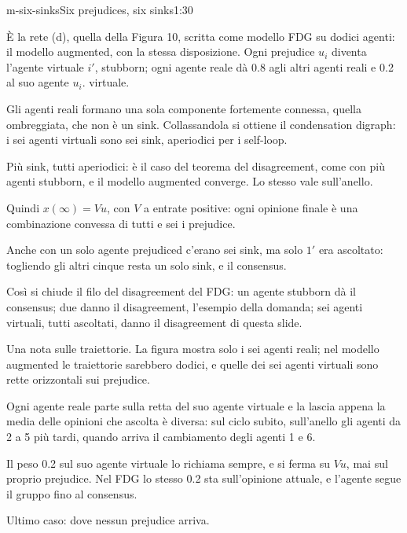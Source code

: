 \begin{slidetre}{m-six-sinks}{Six prejudices, six sinks}{1:30 {\color{red}}}
  \begin{discorso}
    \item {\color{red}   } {\color{blue}È la rete (d), quella} della {\color{red} } {\color{blue}Figura 10, scritta} come modello FDG su dodici {\color{red}} {\color{blue}agenti:} il modello {\color{red}} {\color{blue}augmented, con la stessa disposizione.} Ogni {\color{blue}prejudice $u_i$ diventa l'agente virtuale $i'$, stubborn; ogni} agente reale dà {\color{red} } 0.8 agli altri agenti reali e 0.2 al suo agente {\color{red}     } {\color{red}$u_i$.} {\color{blue}virtuale.}
    \item Gli agenti reali formano una sola componente fortemente connessa, quella ombreggiata, che non è un sink. Collassandola si ottiene il condensation digraph: i sei agenti virtuali sono sei sink, aperiodici per i self-loop.
    \item Più sink, tutti aperiodici: {\color{red}} {\color{blue}è} il {\color{blue}caso del} teorema del {\color{red}    } disagreement, come con più agenti {\color{red}} {\color{blue}stubborn, e il modello augmented converge.} Lo stesso vale sull'anello.
    \item {\color{blue}\clic} Quindi $x(\infty)=Vu$, con $V$ a entrate positive: ogni opinione finale è una combinazione convessa di tutti e sei i prejudice.
    \item Anche con un solo agente prejudiced c'erano sei sink, ma solo $1'$ era ascoltato: togliendo gli altri cinque resta un solo sink, e il consensus.
    \item Così si chiude il filo del disagreement del FDG: un agente stubborn dà il consensus; due danno il disagreement, l'esempio della domanda; sei agenti virtuali, tutti ascoltati, danno il disagreement di questa slide.
    \item \clic Una nota sulle traiettorie. La figura mostra solo i sei agenti reali; nel modello augmented le traiettorie sarebbero dodici, e quelle dei sei agenti virtuali sono rette orizzontali sui prejudice.
    \item Ogni agente reale parte sulla retta del suo agente virtuale e la lascia appena la media delle opinioni che ascolta è diversa: sul ciclo subito, sull'anello gli agenti da 2 a 5 più tardi, quando arriva il cambiamento degli agenti 1 e 6.
    \item Il peso 0.2 sul suo agente virtuale lo richiama sempre, e si ferma su $Vu$, mai sul proprio prejudice. Nel FDG lo stesso 0.2 sta sull'opinione attuale, e l'agente segue il gruppo fino al consensus.
    \item Ultimo caso: dove nessun prejudice arriva.
  \end{discorso}
\end{slidetre}

